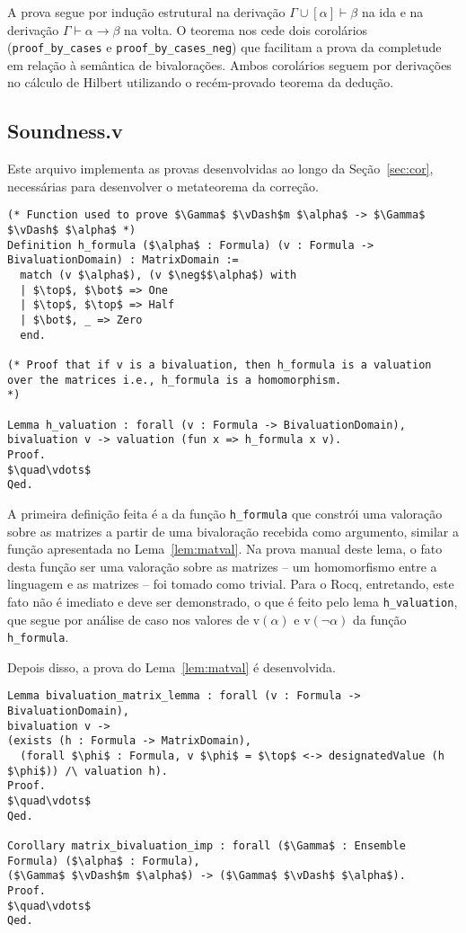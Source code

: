           A prova segue por indução estrutural na derivação $\Gamma \cup [\alpha] \vdash \beta$ na ida e na derivação $\Gamma \vdash \alpha \to \beta$ na volta. O teorema nos cede dois corolários (\texttt{proof\_by\_cases} e \texttt{proof\_by\_cases\_neg}) que facilitam a prova da completude em relação à semântica de bivalorações. Ambos corolários seguem por derivações no cálculo de Hilbert utilizando o recém-provado teorema da dedução.

        \subsection{Soundness.v}
        
        Este arquivo implementa as provas desenvolvidas ao longo da Seção~\ref{sec:cor}, necessárias para desenvolver o metateorema da correção.
        \begin{lstlisting}[name=Soundness, frame=single, language=coq]
(* Function used to prove $\Gamma$ $\vDash$m $\alpha$ -> $\Gamma$ $\vDash$ $\alpha$ *)
Definition h_formula ($\alpha$ : Formula) (v : Formula -> BivaluationDomain) : MatrixDomain :=
  match (v $\alpha$), (v $\neg$$\alpha$) with
  | $\top$, $\bot$ => One
  | $\top$, $\top$ => Half
  | $\bot$, _ => Zero
  end.

(* Proof that if v is a bivaluation, then h_formula is a valuation over the matrices i.e., h_formula is a homomorphism.
*)

Lemma h_valuation : forall (v : Formula -> BivaluationDomain),
bivaluation v -> valuation (fun x => h_formula x v).
Proof.
$\quad\vdots$
Qed.
        \end{lstlisting}

        A primeira definição feita é a da função \texttt{h\_formula} que constrói uma valoração sobre as matrizes a partir de uma bivaloração recebida como argumento, similar a função apresentada no Lema~\ref{lem:matval}. Na prova manual deste lema, o fato desta função ser uma valoração sobre as matrizes {--} um homomorfismo entre a linguagem e as matrizes {--} foi tomado como trivial. Para o Rocq, entretando, este fato não é imediato e deve ser demonstrado, o que é feito pelo lema \texttt{h\_valuation}, que segue por análise de caso nos valores de v$(\alpha)$ e v$(\neg \alpha)$ da função \texttt{h\_formula}.

        Depois disso, a prova do Lema~\ref{lem:matval} é desenvolvida.

        \begin{lstlisting}[name=Soundness, frame=single, language=coq]
Lemma bivaluation_matrix_lemma : forall (v : Formula -> BivaluationDomain),
bivaluation v -> 
(exists (h : Formula -> MatrixDomain),
  (forall $\phi$ : Formula, v $\phi$ = $\top$ <-> designatedValue (h $\phi$)) /\ valuation h).
Proof. 
$\quad\vdots$
Qed.

Corollary matrix_bivaluation_imp : forall ($\Gamma$ : Ensemble Formula) ($\alpha$ : Formula), 
($\Gamma$ $\vDash$m $\alpha$) -> ($\Gamma$ $\vDash$ $\alpha$).
Proof.
$\quad\vdots$
Qed.
        \end{lstlisting}

